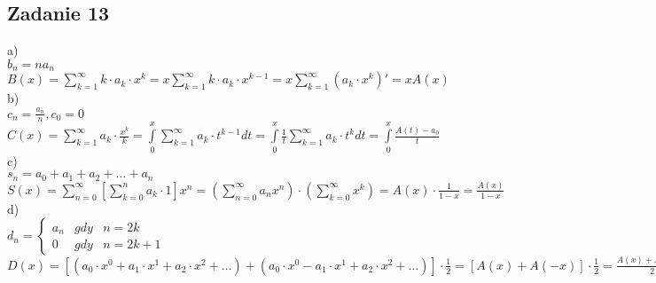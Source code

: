 \documentclass[a4paper]{article}
\begin{document}
\subsection*{Zadanie 13}
a)\\
$b_n=na_n$\\
$B(x)= \sum\limits_{k=1}^{\infty}k\cdot a_k \cdot x^k = x\sum\limits_{k=1}^{\infty}k\cdot a_k \cdot x^{k-1} = x\sum\limits_{k=1}^{\infty} (a_k \cdot x^k)' = xA(x)$\\
b)\\
$c_n=\frac{a_n}{n}, c_0=0$\\
$C(x)= \sum\limits_{k=1}^{\infty}a_k\cdot \frac{x^k}{k} = \int\limits_0^x \sum\limits_{k=1}^{\infty}a_k \cdot t^{k-1} dt = \int\limits_0^x \frac{1}{t} \sum\limits_{k=1}^{\infty}a_k \cdot t^k dt = \int\limits_0^x \frac{A(t)-a_0}{t}$\\
c)\\
$s_n=a_0+a_1+a_2+\ldots+a_n$\\
$S(x)=\sum\limits_{n=0}^\infty [\sum\limits_{k=0}^n a_k\cdot 1]x^n = (\sum\limits_{n=0}^\infty a_n x^n) \cdot (\sum\limits_{k=0}^\infty x^k) = A(x)\cdot \frac{1}{1-x} = \frac{A(x)}{1-x}$\\
d)\\
$d_n=\left\{\begin{matrix}
a_n &gdy  &n=2k \\ 
0 &gdy  &n=2k+1 
\end{matrix}\right.$\\
$D(x)=[(a_0\cdot x^0+a_1\cdot x^1+a_2\cdot x^2 + \ldots) + (a_0\cdot x^0-a_1\cdot x^1+a_2\cdot x^2 + \ldots)] \cdot \frac{1}{2} = [A(x)+A(-x)]\cdot \frac{1}{2} = \frac{A(x)+A(-x)}{2}$\\

\clearpage
\end{document}
